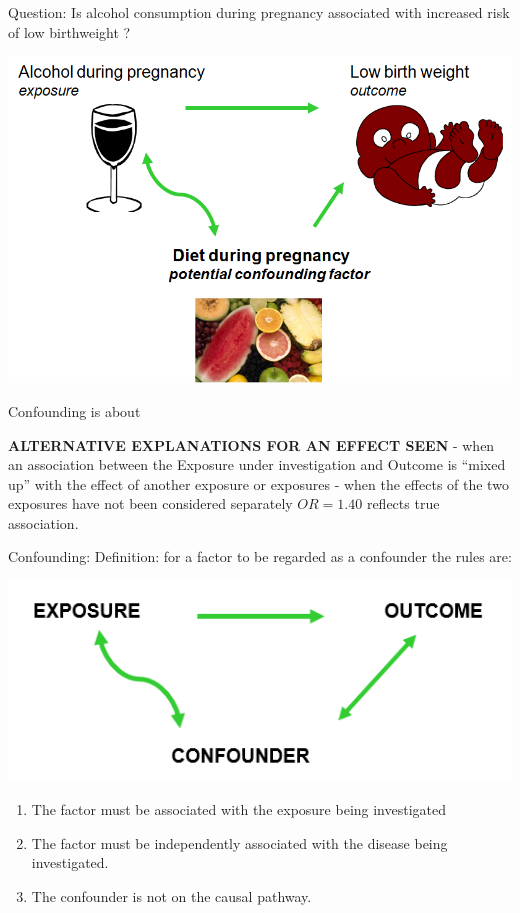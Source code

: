 \documentclass[ignorenonframetext,]{beamer}
\begin{document}
\begin{frame}{Question: Is alcohol consumption during pregnancy
associated with increased risk of low birthweight ?}

\includegraphics{lifestyle8.png}

\end{frame}

\begin{frame}{Confounding is about}

\textbf{ALTERNATIVE EXPLANATIONS FOR AN EFFECT SEEN} - when an
association between the Exposure under investigation and Outcome is
``mixed up'' with the effect of another exposure or exposures - when the
effects of the two exposures have not been considered separately
\(OR = 1.40\) reflects true association.

\end{frame}

\begin{frame}{Confounding: Definition: for a factor to be regarded as a
confounder the rules are:}

\includegraphics{exposure.png}

\begin{enumerate}
\def\labelenumi{\arabic{enumi}.}
\itemsep1pt\parskip0pt
\item
  The factor must be associated with the exposure being investigated
\item
  The factor must be independently associated with the disease being
  investigated.
\item
  The confounder is not on the causal pathway.
\end{enumerate}

\end{frame}
\end{document}
